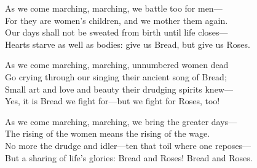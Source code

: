 \noindent As we come marching, marching, we battle too for men---\\
For they are women's children, and we mother them again.\\
Our days shall not be sweated from birth until life closes---\\
Hearts starve as well as bodies: give us Bread, but give us Roses.

\medskip

\noindent As we come marching, marching, unnumbered women dead\\
Go crying through our singing their ancient song of Bread;\\
Small art and love and beauty their drudging spirits knew---\\
Yes, it is Bread we fight for---but we fight for Roses, too!

\medskip

\noindent As we come marching, marching, we bring the greater days---\\
The rising of the women means the rising of the wage.\\
No more the drudge and idler---ten that toil where one reposes---\\
But a sharing of life's glories: Bread and Roses! Bread and Roses.
